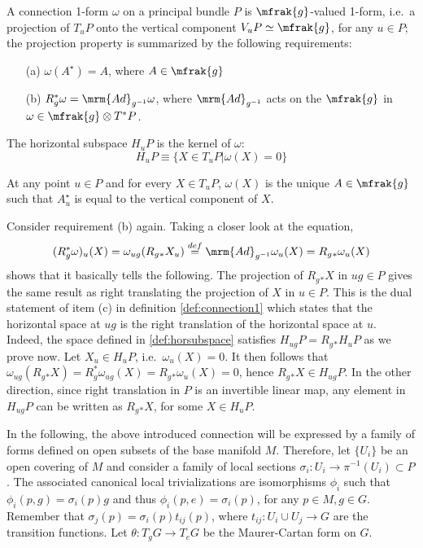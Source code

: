 \documentclass[10pt,reqno]{amsart}
\numberwithin{equation}{section}
\begin{document}
\begin{definition}\label{def:connection2}
	A connection 1-form $\omega$ on a principal bundle $P$ is 
	$\mfrak{g}$-valued 1-form, i.e.\ a projection of $T_uP$ onto 
	the vertical component $V_uP \simeq \mfrak{g}$, for any $u \in 
	P$; the projection property is summarized by the following 
	requirements:
	\begin{itemize}
		\item[(a)] $\omega(A^\star) = A$, where $A \in \mfrak{g}$
		\item[(b)] $R_g^\ast \omega = \mrm{Ad}_{g^{-1}} \omega$, 
			where $\mrm{Ad}_{g^{-1}}$ acts on the $\mfrak{g}$ in 
			$\omega \in \mfrak{g} \otimes T^\ast P$.
	\end{itemize}
	The horizontal subspace $H_uP$ is the kernel of $\omega$:
	\begin{equation}\label{def:horsubspace}
		H_uP \equiv \{ X \in T_uP | \omega(X) = 0 \}
	\end{equation}
\end{definition}
%
At any point $u \in P$ and for every $X \in T_uP$, $\omega(X)$ is 
the unique $A \in \mfrak{g}$ such that $A^\star_u$ is equal to 
the vertical component of $X$.

Consider requirement (b) again. Taking a closer look at the 
equation,
%
\begin{displaymath}
	(R_g^\ast\omega)_{u}(X) = \omega_{ug}(R_g{}_\ast X_u) 
	\overset{def}{=} \mrm{Ad}_{g^{-1}}\omega_u(X) = R_g{}_\ast 
	\omega_u(X)
\end{displaymath}
%
shows that it basically tells the following. The projection of 
$R_g{}_\ast X$ in $ug \in P$ gives the same result as right 
translating the projection of $X$ in $u \in P$. This is the dual 
statement of item (c) in definition \ref{def:connection1} which 
states that the horizontal space at $ug$ is the right translation 
of the horizontal space at $u$. Indeed, the space defined in 
\eqref{def:horsubspace} satisfies $H_{ug}P = R_g{}_\ast H_uP$ as 
we prove now. Let $X_u \in H_uP$, i.e.\ $\omega_u(X) = 0$. It 
then follows that $\omega_{ug}(R_g{}_\ast X) = R_g^\ast 
\omega_{ug}(X) = R_g{}_\ast \omega_u(X) = 0$, hence $R_g{}_\ast X 
\in H_{ug}P$. In the other direction, since right translation in 
$P$ is an invertible linear map, any element in $H_{ug}P$ can be 
written as $R_g{}_\ast X$, for some $X \in H_uP$.

\blankline
In the following, the above introduced connection will be 
expressed by a family of forms defined on open subsets of the 
base manifold $M$. Therefore, let $\{U_i\}$ be an open covering 
of $M$ and consider a family of local sections $\sigma_i : U_i 
\rightarrow \pi^{-1}(U_i)\subset P$. The associated canonical 
local trivializations are isomorphisms $\phi_i$ such that 
$\phi_i(p,g) = \sigma_i(p)g$ and thus $\phi_i(p,e) = 
\sigma_i(p)$, for any $p \in M, g \in G$. Remember that 
$\sigma_j(p) = \sigma_i(p) t_{ij}(p)$, where $t_{ij} : U_i \cup 
U_j \rightarrow G$ are the transition functions. Let $\theta: 
T_gG \rightarrow T_eG$ be the Maurer-Cartan form on $G$.
\end{document}
